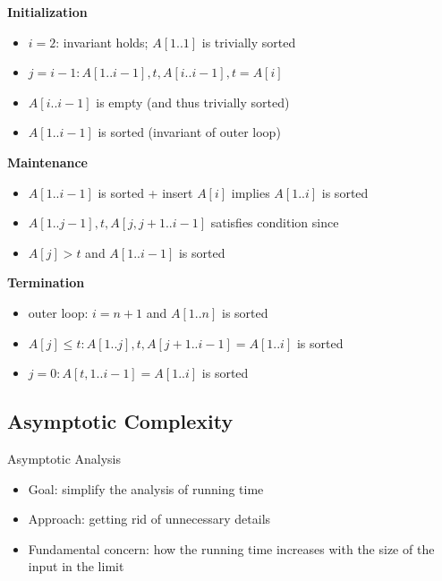 \textbf{Initialization}
\begin{itemize}
    \item $i=2$: invariant holds; $A[1..1]$ is trivially sorted 
    \item $j= i-1: A[1..i-1],t,A[i..i-1],t=A[i]$
    \item[] $A[i..i-1]$ is empty (and thus trivially sorted)
    \item[] $A[1..i-1]$ is sorted (invariant of outer loop) 
\end{itemize}

\textbf{Maintenance}
\begin{itemize}
    \item $A[1..i-1]$ is sorted + insert $A[i]$ implies $A[1..i]$ is sorted
    \item $A[1..j-1],t,A[j,j+1..i-1]$ satisfies condition since
    \item[] $A[j]>t $ and $A[1..i-1] $ is sorted
\end{itemize}

\textbf{Termination}
\begin{itemize}
    \item outer loop: $i=n+1$ and $A[1..n]$ is sorted
    \item $A[j]\leq t:A[1..j],t,A[j+1..i-1]=A[1..i] $ is sorted
    \item $j=0: A[t,1..i-1] = A[1..i]$ is sorted
\end{itemize}

\subsection{Asymptotic Complexity}

Asymptotic Analysis
\begin{itemize}
    \item Goal: simplify the analysis of running time
    \item Approach: getting rid of unnecessary details
    \item Fundamental concern: how the running time increases with the size of the input in the limit
\end{itemize}

